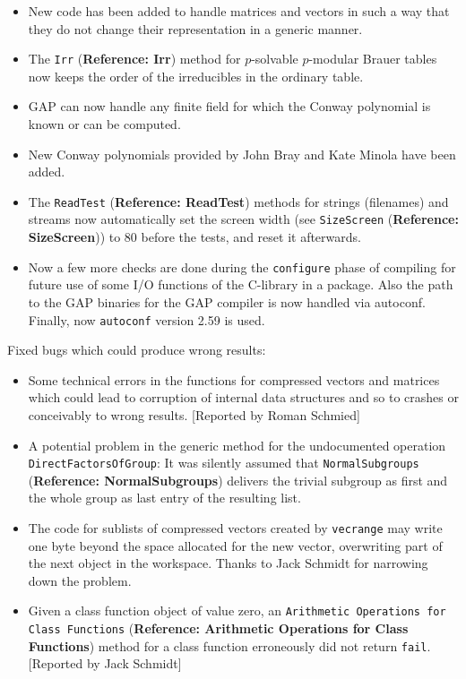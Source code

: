 \documentclass[a4paper,11pt]{report}
\begin{document}
{{\begin{itemize}
packages already use it. 
\item  New code has been added to handle matrices and vectors in such a way that they
do not change their representation in a generic manner. 
\item  The \texttt{Irr} (\textbf{Reference: Irr}) method for $p$-solvable $p$-modular Brauer tables now keeps the order of the irreducibles in the ordinary
table. 
\item  \textsf{GAP} can now handle any finite field for which the Conway polynomial is known or
can be computed. 
\item  New Conway polynomials provided by John Bray and Kate Minola have been added. 
\item  The \texttt{ReadTest} (\textbf{Reference: ReadTest}) methods for strings (filenames) and streams now automatically set the screen
width (see \texttt{SizeScreen} (\textbf{Reference: SizeScreen})) to 80 before the tests, and reset it afterwards. 
\item  Now a few more checks are done during the \texttt{configure} phase of compiling for future use of some I/O functions of the C-library in a
package. Also the path to the \textsf{GAP} binaries for the \textsf{GAP} compiler is now handled via autoconf. Finally, now \texttt{autoconf} version 2.59 is used. 
\end{itemize}
 Fixed bugs which could produce wrong results: 
\begin{itemize}
\item  Some technical errors in the functions for compressed vectors and matrices
which could lead to corruption of internal data structures and so to crashes
or conceivably to wrong results. [Reported by Roman Schmied] 
\item  A potential problem in the generic method for the undocumented operation \texttt{DirectFactorsOfGroup}: It was silently assumed that \texttt{NormalSubgroups} (\textbf{Reference: NormalSubgroups}) delivers the trivial subgroup as first and the whole group as last entry of
the resulting list. 
\item  The code for sublists of compressed vectors created by \texttt{vec\texttt{}range\texttt{}} may write one byte beyond the space allocated for the new vector, overwriting
part of the next object in the workspace. Thanks to Jack Schmidt for narrowing
down the problem. 
\item  Given a class function object of value zero, an \texttt{Arithmetic Operations for Class Functions} (\textbf{Reference: Arithmetic Operations for Class Functions}) method for a class function erroneously did not return \texttt{fail}. [Reported by Jack Schmidt] 

\end{itemize}}}
\end{document}
